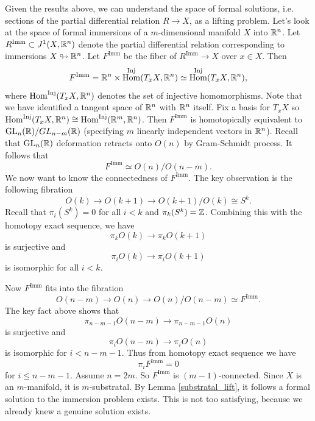 \documentclass{article}
\newtheorem{proposed work}[theorem]{Proposed Work}
\DeclareMathOperator{\Hom}{Hom}
\DeclareMathOperator{\Imm}{Imm}
\DeclareMathOperator{\GL}{GL}
\begin{document}
Given the results above, we can understand the space of formal solutions, i.e. sections of the partial differential relation $R\to X$, as a lifting problem. Let's look at the space of formal immersions of a $m$-dimensional manifold $X$ into $\mathbb R^n$. Let $R^{\Imm} \subset J^1(X,\R^n)$ denote the partial differential relation corresponding to immersions $X\looparrowright \mathbb R^n$. Let $F^{\Imm}$ be the fiber of $R^{\Imm}\to X$ over $x \in X$. Then
\begin{equation*}
F^{\Imm} = \R^n \times \Hom^{\mathrm{Inj}}(T_xX,\R^n) \simeq \Hom^{\mathrm{Inj}}(T_xX,\R^n),
\end{equation*}
where $\Hom^{\mathrm{Inj}}(T_xX,\R^n)$ denotes the set of injective homomorphisms. Note that we have identified a tangent space of $\mathbb R^n$ with $\mathbb R^n$ itself. Fix a basis for $T_xX$ so $\Hom^{\mathrm{Inj}}(T_xX,\R^n) \cong \Hom^{\mathrm{Inj}}(\R^m,\R^n)$. Then $F^{\Imm}$ is homotopically equivalent to $\GL_n(\R)/GL_{n-m}(\R)$ (specifying $m$ linearly independent vectors in $\mathbb R^n$). Recall that $\GL_n(\R)$ deformation retracts onto $O(n)$ by Gram-Schmidt process. It follows that
\begin{equation*}
F^{\Imm} \simeq O(n)/O(n-m).
\end{equation*}
We now want to know the connectedness of $F^{\Imm}$. The key observation is the following fibration
\begin{equation*}
O(k)\to O(k+1) \to O(k+1)/O(k) \cong S^k.
\end{equation*}
Recall that $\pi_i(S^k) = 0$ for all $i <k$ and $\pi_k(S^k) = \mathbb Z$. Combining this with the homotopy exact sequence, we have
\begin{equation*}
\pi_k O(k) \to \pi_k O(k+1)
\end{equation*}
is surjective and
\begin{equation*}
\pi_i O(k) \to \pi_i O(k+1)
\end{equation*}
is isomorphic for all $i < k$.

Now $F^{\Imm}$ fits into the fibration
\begin{equation*}
O(n-m)\to O(n) \to O(n)/O(n-m) \simeq F^{\Imm}.
\end{equation*}
The key fact above shows that
\begin{equation*}
\pi_{n-m-1}O(n-m)\to\pi_{n-m-1}O(n)
\end{equation*}
is surjective and
\begin{equation*}
\pi_{i}O(n-m)\to\pi_{i}O(n)
\end{equation*}
is isomorphic for $i < n-m-1$. Thus from homotopy exact sequence we have
\begin{equation*}
\pi_iF^{\Imm} = 0
\end{equation*}
for $i \le n-m-1$. Assume $n=2m$. So $F^{\Imm}$ is $(m-1)$-connected. Since $X$ is an $m$-manifold, it is $m$-substratal. By Lemma \ref{substratal_lift}, it follows a formal solution to the immersion problem exists. This is not too satisfying, because we already knew a genuine solution exists.
\end{document}
